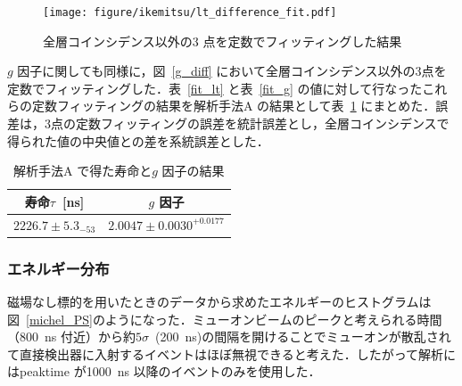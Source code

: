 \begin{figure}[H]
\centering
\texttt{[image: figure/ikemitsu/lt\_difference\_fit.pdf]}
\caption{全層コインシデンス以外の3 点を定数でフィッティングした結果}
\label{lt_diff_fit}
\end{figure}

$g$ 因子に関しても同様に，図~\ref{g_diff} において全層コインシデンス以外の3点を定数でフィッティングした．表~\ref{fit_lt} と表~\ref{fit_g} の値に対して行なったこれらの定数フィッティングの結果を解析手法A の結果として表~\ref{kaisekiA_matome} にまとめた．誤差は，3点の定数フィッティングの誤差を統計誤差とし，全層コインシデンスで得られた値の中央値との差を系統誤差とした．

\begin{table}[H]
\caption{解析手法A で得た寿命と$g$ 因子の結果}
\label{kaisekiA_matome}
\centering
\begin{tabular}{cc}\toprule
寿命$\tau$~[ns] & $g$ 因子 \\ \midrule
$2226.7\pm5.3 _{-53}$ & $2.0047\pm 0.0030^{+0.0177}$ \\ \bottomrule
\end{tabular}
\end{table}
  
\subsubsection{エネルギー分布}
磁場なし標的を用いたときのデータから求めたエネルギーのヒストグラムは図~\ref{michel_PS}のようになった．ミューオンビームのピークと考えられる時間（800~ns 付近）から約$5\sigma$~(200~ns)の間隔を開けることでミューオンが散乱されて直接検出器に入射するイベントはほぼ無視できると考えた．したがって解析にはpeaktime が1000~ns 以降のイベントのみを使用した．
  
